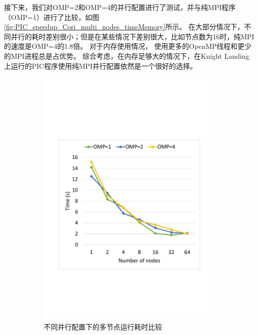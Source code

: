 接下来，我们对OMP=2和OMP=4的并行配置进行了测试，并与纯MPI程序（OMP=1）进行了比较，如图\ref{fig:PIC_speedup_Cori_multi_nodes_timeMemory}所示。
在大部分情况下，不同并行的耗时差别很小；但是在某些情况下差别很大，比如节点数为16时，纯MPI的速度是OMP=4的1.8倍。
对于内存使用情况， 使用更多的OpenMP线程和更少的MPI进程总是占优势。
综合考虑，在内存足够大的情况下，在Knight Landing上运行的PIC程序使用纯MPI并行配置依然是一个很好的选择。

\begin{figure}[!htb]
    \centering
    \begin{subfigure}[b]{0.48\textwidth}
        \includegraphics[width=\textwidth]{Img/PIC_speedup_Cori_multi_nodes_time.pdf}
        \caption{不同并行配置下的多节点运行耗时比较}
    \end{subfigure}
    \begin{subfigure}[b]{0.48\textwidth}

\end{subfigure}
\end{figure}
